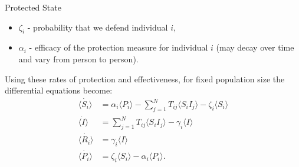 \documentclass[unknownkeysallowed]{beamer}
\begin{document}
\begin{frame}{Protected State}
\begin{itemize}
	\item $\zeta_i$ - probability that we defend individual $i$,
	\item $\alpha_i$ - efficacy of the protection measure for individual $i$ (may decay over time and vary from person to person). 	
\end{itemize}
\pause
Using these rates of protection and effectiveness, for fixed population size the differential equations become:
\pause
\begin{align}
\dot{\langle S_i \rangle} & = \alpha_i \langle P_i \rangle - \sum^{N}_{j=1}T_{ij} \langle S_i I_j \rangle - \zeta_i\langle S_i \rangle\\
\dot{\langle I \rangle} & =\sum^{N}_{j=1}T_{ij}\langle S_i I_j \rangle - \gamma_i \langle I \rangle \\
\dot{\langle R_i \rangle} & = \gamma_i \langle I \rangle \\
\dot{\langle P_i \rangle} & = \zeta_i \langle S_i \rangle - \alpha_i \langle P_i \rangle.
\end{align} 

\end{frame}


\end{document}
